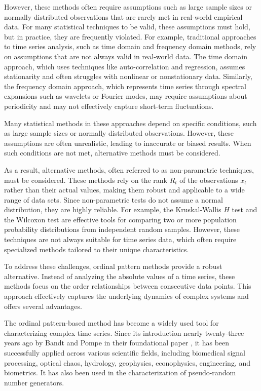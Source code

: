 However, these methods often require assumptions such as large sample sizes or normally distributed observations that are rarely met in real-world empirical data. For many statistical techniques to be valid, these assumptions must hold, but in practice, they are frequently violated.
For example, traditional approaches to time series analysis, such as time domain and frequency domain methods, rely on assumptions that are not always valid in real-world data. The time domain approach, which uses techniques like auto-correlation and regression, assumes stationarity and often struggles with nonlinear or nonstationary data. Similarly, the frequency domain approach, which represents time series through spectral expansions such as wavelets or Fourier modes, may require assumptions about periodicity and may not effectively capture short-term fluctuations.

Many statistical methods in these approaches depend on specific conditions, such as large sample sizes or normally distributed observations. However, these assumptions are often unrealistic, leading to inaccurate or biased results. When such conditions are not met, alternative methods must be considered.

As a result, alternative methods, often referred to as non-parametric techniques, must be considered. 
These methods rely on the rank $R_t$ of the observations $x_t$ rather than their actual values, making them robust and applicable to a wide range of data sets. Since non-parametric tests do not assume a normal distribution, they are highly reliable. For example, the Kruskal-Wallis $H$ test and the Wilcoxon test are effective tools for comparing two or more population probability distributions from independent random samples. However, these techniques are not always suitable for time series data, which often require specialized methods tailored to their unique characteristics.

To address these challenges, ordinal pattern methods provide a robust alternative. Instead of analyzing the absolute values of a time series, these methods focus on the order relationships between consecutive data points.
This approach effectively captures the underlying dynamics of complex systems and offers several advantages.

The ordinal pattern-based method has become a widely used tool for characterizing complex time series. Since its introduction nearly twenty-three years ago by Bandt and Pompe in their foundational paper \cite{PhysRevLett.88.174102}, it has been successfully applied across various scientific fields, including biomedical signal processing, optical chaos, hydrology, geophysics, econophysics, engineering, and biometrics. It has also been used in the characterization of pseudo-random number generators.
   
